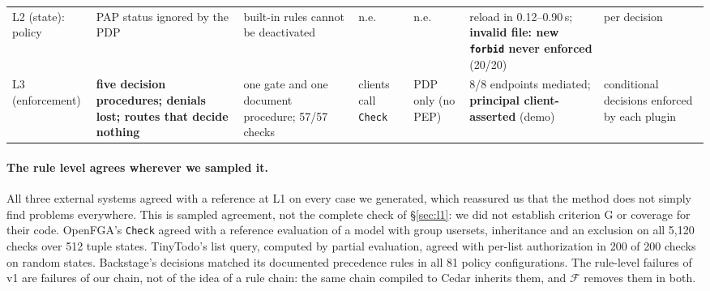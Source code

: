 \begin{table}[t]
\begin{tabularx}{\textwidth}{@{}l@{\;\;}X@{\;\;}X@{\;\;}X@{\;\;}X@{\;\;}X@{\;\;}X@{}}
L2 (state): policy & PAP status ignored by the PDP & built-in rules cannot be deactivated & n.e. & n.e. & reload in 0.12--0.90\,s; \textbf{invalid file: new \texttt{forbid} never enforced} (20/20) & per decision \\
L3 (enforcement) & \textbf{five decision procedures; denials lost; routes that decide nothing} & one gate and one document procedure; 57/57 checks & clients call \texttt{Check} & PDP only (no PEP) & 8/8 endpoints mediated; \textbf{principal client-asserted} (demo) & conditional decisions enforced by each plugin \\
\bottomrule
\end{tabularx}
\end{table}

\paragraph{The rule level agrees wherever we sampled it.} All three external systems agreed with a reference at L1 on
every case we generated, which reassured us that the method does not simply find problems everywhere. This is
sampled agreement, not the complete check of \S\ref{sec:l1}: we did not establish criterion G or coverage for
their code. OpenFGA's \texttt{Check} agreed with a reference
evaluation of a model with group usersets, inheritance and an exclusion on all 5{,}120 checks over 512 tuple
states. TinyTodo's list query, computed by partial evaluation, agreed with per-list authorization in 200 of 200
checks on random states. Backstage's decisions matched its documented precedence rules in all 81 policy
configurations. The rule-level failures of \sysname v1 are failures of our chain, not of the idea of a rule
chain: the same chain compiled to Cedar inherits them, and $\mathcal{F}$ removes them in both.

